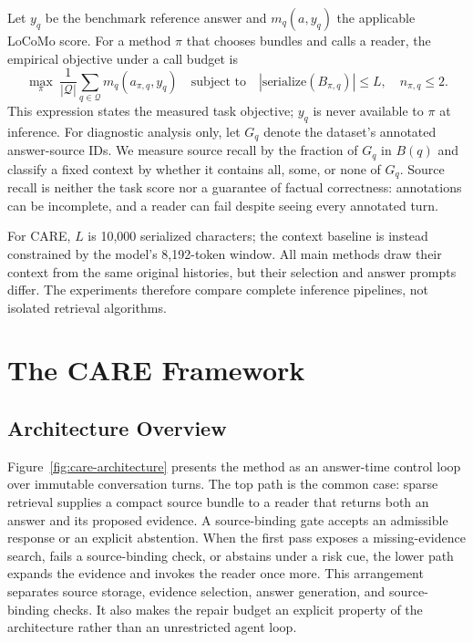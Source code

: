 \documentclass[11pt]{article}
\newcommand{\care}{\textsc{CARE}}
\begin{document}
Let $y_q$ be the benchmark reference answer and $m_q(a,y_q)$ the applicable
LoCoMo score. For a method $\pi$ that chooses bundles and calls a reader,
the empirical objective under a call budget is
\begin{equation}
\max_{\pi}\ \frac{1}{|\mathcal{Q}|}\sum_{q\in\mathcal{Q}}m_q(a_{\pi,q},y_q)
\quad\text{subject to}\quad |\mathrm{serialize}(B_{\pi,q})|\leq L,
\quad n_{\pi,q}\leq 2.
\label{eq:objective}
\end{equation}
This expression states the measured task objective; $y_q$ is never available
to $\pi$ at inference. For diagnostic analysis only, let $G_q$ denote the
dataset's annotated answer-source IDs. We measure source recall by the
fraction of $G_q$ in $B(q)$ and classify a fixed context by whether it
contains all, some, or none of $G_q$. Source recall is neither the task
score nor a guarantee of factual correctness: annotations can be incomplete,
and a reader can fail despite seeing every annotated turn.

For \care{}, $L$ is 10,000 serialized characters; the context baseline is
instead constrained by the model's 8,192-token window. All main methods draw
their context from the same original histories, but their selection and
answer prompts differ. The experiments therefore compare complete inference
pipelines, not isolated retrieval algorithms.

\section{The \care{} Framework}
\label{sec:method}

\subsection{Architecture Overview}

Figure~\ref{fig:care-architecture} presents the method as an answer-time
control loop over immutable conversation turns. The top path is the common
case: sparse retrieval supplies a compact source bundle to a reader that
returns both an answer and its proposed evidence. A source-binding gate accepts
an admissible response or an explicit abstention. When the first pass exposes
a missing-evidence search, fails a source-binding check, or abstains under a
risk cue, the lower path expands the evidence and invokes the reader once
more. This arrangement separates source storage, evidence selection,
answer generation, and source-binding checks. It also makes the repair budget an
explicit property of the architecture rather than an unrestricted agent loop.
\end{document}
